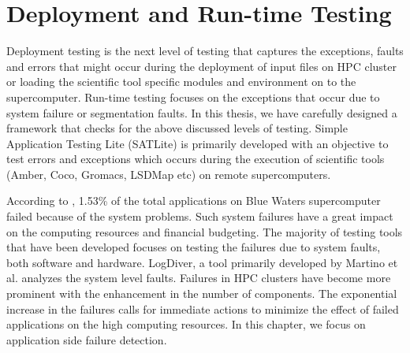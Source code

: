 \documentclass[10pt]{ruthesis}
\begin{document}

\chapter{Deployment and Run-time Testing}

Deployment testing is the next level of testing that captures the exceptions, faults and errors that might occur during the deployment of input files on HPC cluster or loading the scientific tool specific modules and environment on to the supercomputer. Run-time testing focuses on the exceptions that occur due to system failure or segmentation faults. In this thesis, we have carefully designed a framework that checks for the above discussed levels of testing. Simple Application Testing Lite (SATLite) is primarily developed with an objective to test errors and exceptions which occurs during the execution of scientific tools (Amber, Coco, Gromacs, LSDMap etc) on remote supercomputers. 

According to \cite{ref6}, 1.53\% of the total applications on Blue Waters supercomputer failed because of the system problems. Such system failures have a great impact on the computing resources and financial budgeting. The majority of testing tools that have been developed focuses on testing the failures due to system faults, both software and hardware. LogDiver, a tool primarily developed by Martino et al. \cite{ref6} analyzes the system level faults. Failures in HPC clusters have become more prominent with the enhancement in the number of components. The exponential increase in the failures calls for immediate actions to minimize the effect of failed applications on the high computing resources. In this chapter, we focus on application side failure detection. 
\end{document}
